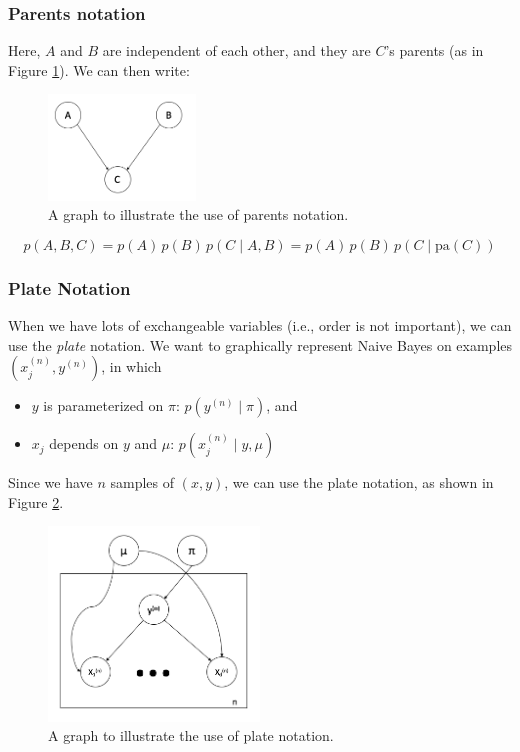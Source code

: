 \documentclass{article}
\begin{document}
\subsubsection{Parents notation}
Here, $A$ and $B$ are independent of each other, and they are $C$'s parents (as in Figure \ref{fig:nb3}). We can then write:
\begin{figure}[!ht]
    \centering
    \includegraphics[width = 0.35\textwidth]{nb3.png}
    \caption{A graph to illustrate the use of parents notation.}
    \label{fig:nb3}
\end{figure}
\[
p(A, B, C) = p(A)\, p(B)\, p(C \mid A, B) = p(A) \, p(B) \, p(C \mid \mathrm{pa}(C))
\]



\FloatBarrier
\subsubsection{Plate Notation}
When we have lots of exchangeable variables (i.e., order is not important), we can use the \emph{plate} notation.
We want to graphically represent Naive Bayes on examples $(x_j^{(n)}, y^{(n)})$, in which
\begin{itemize}
\item $y$ is parameterized on $\pi$: $p(y^{(n)} \mid \pi)$, and
\item $x_{j}$ depends on $y$ and $\mu$: $p(x_{j}^{(n)} \mid y, \mu)$
\end{itemize}
Since we have $n$ samples of $(x, y)$, we can use the plate notation, as shown in Figure \ref{fig:nb4}.
\begin{figure}[!ht]
    \centering
    \includegraphics[width = 0.5\textwidth]{nb4.png}
    \caption{A graph to illustrate the use of plate notation.}
    \label{fig:nb4}
\end{figure}
\FloatBarrier
\end{document}

